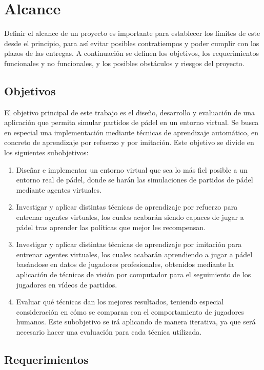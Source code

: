 \chapter{Alcance}\label{chapter:alcance}

Definir el alcance de un proyecto es importante para establecer los límites de este desde el principio, para así evitar posibles contratiempos y poder cumplir con los plazos de las entregas. A continuación se definen los objetivos, los requerimientos funcionales y no funcionales, y los posibles obstáculos y riesgos del proyecto.

\section{Objetivos}

El objetivo principal de este trabajo es el diseño, desarrollo y evaluación de una aplicación que permita simular partidos de pádel en un entorno virtual. Se busca en especial una implementación mediante técnicas de aprendizaje automático, en concreto de aprendizaje por refuerzo y por imitación. Este objetivo se divide en los siguientes subobjetivos:
\begin{enumerate}
    \item Diseñar e implementar un entorno virtual que sea lo más fiel posible a un entorno real de pádel, donde se harán las simulaciones de partidos de pádel mediante agentes virtuales.
    \item Investigar y aplicar distintas técnicas de aprendizaje por refuerzo para entrenar agentes virtuales, los cuales acabarán siendo capaces de jugar a pádel tras aprender las políticas que mejor les recompensan.
    \item Investigar y aplicar distintas técnicas de aprendizaje por imitación para entrenar agentes virtuales, los cuales acabarán aprendiendo a jugar a pádel basándose en datos de jugadores profesionales, obtenidos mediante la aplicación de técnicas de visión por computador para el seguimiento de los jugadores en vídeos de partidos.
    \item Evaluar qué técnicas dan los mejores resultados, teniendo especial consideración en cómo se comparan con el comportamiento de jugadores humanos. Este subobjetivo se irá aplicando de manera iterativa, ya que será necesario hacer una evaluación para cada técnica utilizada.
\end{enumerate}

\section{Requerimientos}

